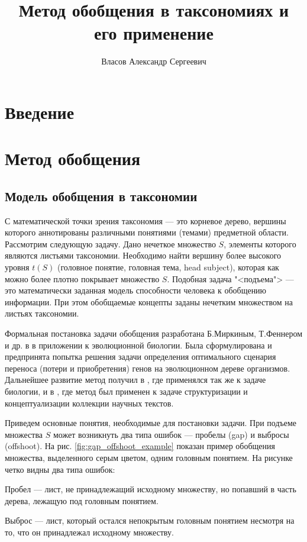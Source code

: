 \documentclass[12pt]{article}
\newenvironment{itemize*}%
{\begin{itemize}%
		\setlength{\itemsep}{0pt}%
		\setlength{\parskip}{0pt}}%
	{\end{itemize}}
\begin{document}
%

\title{Метод обобщения в таксономиях и его применение}
\author{Власов Александр Сергеевич}
\date{}
\maketitle
\tableofcontents

\section{Введение}

\section{Метод обобщения}

\subsection{Модель обобщения в таксономии}

С математической точки зрения таксономия --- это корневое дерево, вершины которого аннотированы различными понятиями (темами) предметной области. Рассмотрим следующую задачу. Дано нечеткое множество $S$, элементы которого являются листьями таксономии. Необходимо найти вершину более высокого уровня $t(S)$ (головное понятие, головная тема, head subject), которая как можно более плотно покрывает множество $S$. Подобная задача "<подъема"> --- это математически заданная модель способности человека к обобщению информации. При этом обобщаемые концепты заданы нечетким множеством на листьях таксономии.

Формальная постановка задачи обобщения разработана Б.Миркиным, Т.Феннером и др. в \cite{mirkin2003algorithms} в приложении к эволюционной биологии. Была сформулирована и предпринята попытка решения задачи определения оптимального сценария переноса (потери и приобретения) генов на эволюционном дереве организмов. Дальнейшее развитие метод получил в \cite{mirkin2006aggregating}, где применялся так же к задаче биологии, и в \cite{mirkin2018preprint}, где метод был применен к задаче структуризации и концептуализации коллекции научных текстов.

Приведем основные понятия, необходимые для постановки задачи. При подъеме множества $S$ может возникнуть два типа ошибок --- пробелы (gap) и выбросы (offshoot). На рис. \ref{fig:gap_offshoot_example} показан пример обобщения множества, выделенного серым цветом, одним головным понятием. На рисунке четко видны два типа ошибок:
\begin{itemize*}
	\item Пробел ---  лист, не принадлежащий исходному множеству, но попавший в часть дерева, лежащую под головным понятием.
	\item Выброс --- лист, который остался непокрытым головным понятием несмотря на то, что он принадлежал исходному множеству. 
\end{itemize*} 
\end{document}
